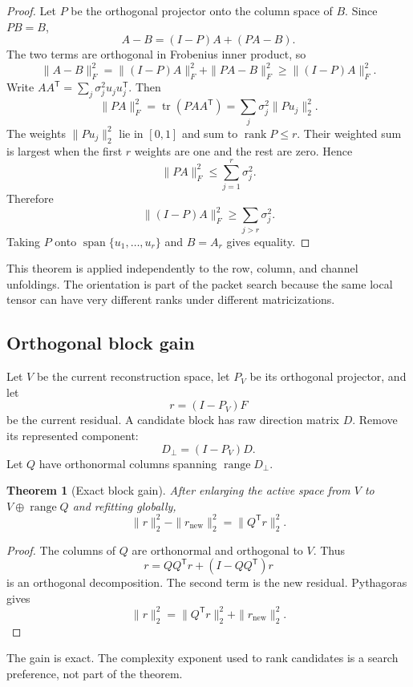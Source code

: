 \documentclass[11pt]{article}
\newtheorem{theorem}{Theorem}[section]
\theoremstyle{definition}
\theoremstyle{remark}
\begin{document}
\begin{proof}
Let $P$ be the orthogonal projector onto the column space of $B$. Since $PB=B$,
\[
A-B=(I-P)A+(PA-B).
\]
The two terms are orthogonal in Frobenius inner product, so
\[
\|A-B\|_F^2
=
\|(I-P)A\|_F^2+
\|PA-B\|_F^2
\ge
\|(I-P)A\|_F^2.
\]
Write $AA^{\mathsf T}=\sum_j\sigma_j^2u_ju_j^{\mathsf T}$. Then
\[
\|PA\|_F^2
=
\operatorname{tr}(PAA^{\mathsf T})
=
\sum_j\sigma_j^2\|Pu_j\|_2^2.
\]
The weights $\|Pu_j\|_2^2$ lie in $[0,1]$ and sum to $\operatorname{rank}P\le r$. Their weighted sum is largest when the first $r$ weights are one and the rest are zero. Hence
\[
\|PA\|_F^2\le\sum_{j=1}^{r}\sigma_j^2.
\]
Therefore
\[
\|(I-P)A\|_F^2
\ge
\sum_{j>r}\sigma_j^2.
\]
Taking $P$ onto $\operatorname{span}\{u_1,\ldots,u_r\}$ and $B=A_r$ gives equality.
\end{proof}

This theorem is applied independently to the row, column, and channel unfoldings. The orientation is part of the packet search because the same local tensor can have very different ranks under different matricizations.

\FloatBarrier
\subsection{Orthogonal block gain}
Let $V$ be the current reconstruction space, let $P_V$ be its orthogonal projector, and let
\[
r=(I-P_V)F
\]
be the current residual. A candidate block has raw direction matrix $D$. Remove its represented component:
\[
D_\perp=(I-P_V)D.
\]
Let $Q$ have orthonormal columns spanning $\operatorname{range}D_\perp$.

\begin{theorem}[Exact block gain]
After enlarging the active space from $V$ to $V\oplus\operatorname{range}Q$ and refitting globally,
\[
\boxed{
\|r\|_2^2-\|r_{\mathrm{new}}\|_2^2
=\|Q^{\mathsf T}r\|_2^2.
}
\]
\end{theorem}

\begin{proof}
The columns of $Q$ are orthonormal and orthogonal to $V$. Thus
\[
r=QQ^{\mathsf T}r+(I-QQ^{\mathsf T})r
\]
is an orthogonal decomposition. The second term is the new residual. Pythagoras gives
\[
\|r\|_2^2
=\|Q^{\mathsf T}r\|_2^2+
\|r_{\mathrm{new}}\|_2^2.
\]
\end{proof}

The gain is exact. The complexity exponent used to rank candidates is a search preference, not part of the theorem.
\end{document}
